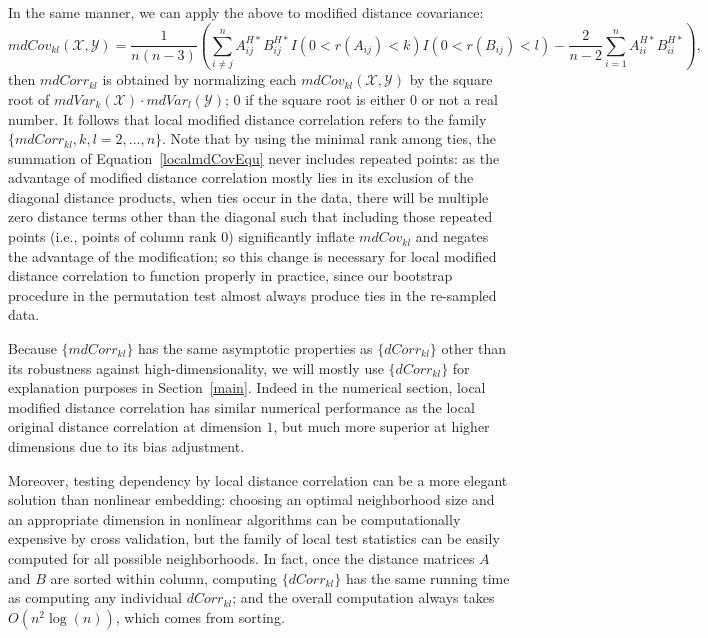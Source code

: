 \documentclass[11pt]{article}
\begin{document}
In the same manner, we can apply the above to modified distance covariance:
\begin{equation}
\label{localmdCovEqu}
mdCov_{kl}(\mathcal{X},\mathcal{Y}) =\frac{1}{n(n-3)}(\sum_{i \neq j}^{n}A^{H*}_{ij}B^{H*}_{ij}I(0<r(A_{ij})<k)I(0<r(B_{ij})<l)-\frac{2}{n-2}\sum_{i=1}^{n}A^{H*}_{ii}B^{H*}_{ii}), 
\end{equation}
then $mdCorr_{kl}$ is obtained by normalizing each $mdCov_{kl}(\mathcal{X},\mathcal{Y})$ by the square root of $mdVar_{k}(\mathcal{X}) \cdot mdVar_{l}(\mathcal{Y})$; $0$ if the square root is either $0$ or not a real number. It follows that local modified distance correlation refers to the family $\{mdCorr_{kl}, k,l=2,\ldots,n\}$. Note that by using the minimal rank among ties, the summation of Equation~\ref{localmdCovEqu} never includes repeated points: as the advantage of modified distance correlation mostly lies in its exclusion of the diagonal distance products, when ties occur in the data, there will be multiple zero distance terms other than the diagonal such that including those repeated points (i.e., points of column rank $0$) significantly inflate $mdCov_{kl}$ and negates the advantage of the modification; so this change is necessary for local modified distance correlation to function properly in practice, since our bootstrap procedure in the permutation test almost always produce ties in the re-sampled data.

Because $\{mdCorr_{kl}\}$ has the same asymptotic properties as $\{dCorr_{kl}\}$ other than its robustness against high-dimensionality, we will mostly use $\{dCorr_{kl}\}$ for explanation purposes in Section~\ref{main}. Indeed in the numerical section, local modified distance correlation has similar numerical performance as the local original distance correlation at dimension $1$, but much more superior at higher dimensions due to its bias adjustment.


Moreover, testing dependency by local distance correlation can be a more elegant solution than nonlinear embedding: choosing an optimal neighborhood size and an appropriate dimension in nonlinear algorithms can be computationally expensive by cross validation, but the family of local test statistics can be easily computed for all possible neighborhoods. In fact, once the distance matrices $A$ and $B$ are sorted within column, computing $\{dCorr_{kl}\}$ has the same running time as computing any individual $dCorr_{kl}$; and the overall computation always takes $O(n^2 \log(n))$, which comes from sorting. 
\end{document}
